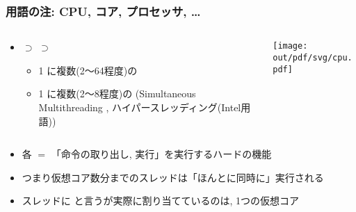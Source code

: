 \documentclass[12pt,dvipdfmx]{beamer}
\begin{document}
\begin{frame}
  \frametitle{用語の注: CPU, コア, プロセッサ, \ldots}
  \begin{columns}
    \begin{column}{0.65\textwidth}
      \begin{itemize}
      \item {} $\supset$  $\supset$  
        \begin{itemize}
        \item<1-> 1  に複数(2〜64程度)の
        \item<2-> 1  に複数(2〜8程度)の
          (Simultaneous Multithreading ,
          ハイパースレッディング(Intel用語))
        \end{itemize}
      \end{itemize}
    \end{column}
    \begin{column}{0.35\textwidth}
      \begin{center}
        \texttt{[image: out/pdf/svg/cpu.pdf]}
      \end{center}
    \end{column}
  \end{columns}
  \begin{itemize}
  \item<3->
    各  $=$ 「命令の取り出し, 実行」を実行するハードの機能
  \item<4-> つまり仮想コア数分までのスレッドは「ほんとに同時に」実行される
  \item<5-> スレッドに
    と言うが実際に割り当てているのは,
    1つの仮想コア
  \end{itemize}
\end{frame}
\end{document}
